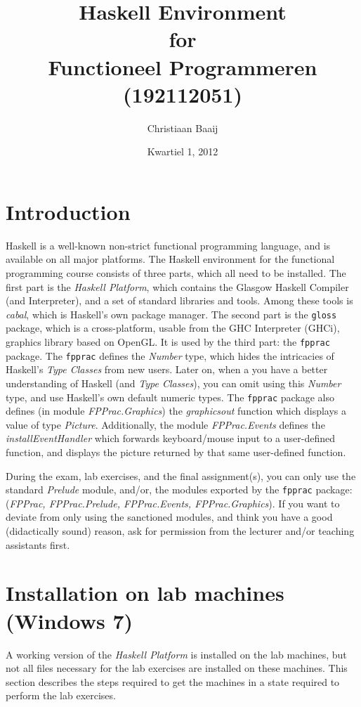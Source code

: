 \documentclass[]{article}
\title{Haskell Environment \\ for \\ Functioneel Programmeren (192112051)}
\author{Christiaan Baaij}
\date{Kwartiel 1, 2012}
\begin{document}

\maketitle

\section{Introduction}
Haskell is a well-known non-strict functional programming language, and is available on all major platforms.
The Haskell environment for the functional programming course consists of three parts, which all need to be installed.
The first part is the \emph{Haskell Platform}, which contains the Glasgow Haskell Compiler (and Interpreter), and a set of standard libraries and tools.
Among these tools is \emph{cabal}, which is Haskell's own package manager. The second part is the \texttt{gloss} package, which is a cross-platform, usable from the GHC Interpreter (GHCi), graphics library based on OpenGL.
It is used by the third part: the \texttt{fpprac} package. The \texttt{fpprac} defines the \emph{Number} type, which hides the intricacies of Haskell's \emph{Type Classes} from new users.
Later on, when a you have a better understanding of Haskell (and \emph{Type Classes}), you can omit using this \emph{Number} type, and use Haskell's own default numeric types.
The \texttt{fpprac} package also defines (in module \emph{FPPrac.Graphics}) the \emph{graphicsout} function which displays a value of type \emph{Picture}. Additionally, the module \emph{FPPrac.Events} defines the \emph{installEventHandler} which forwards keyboard/mouse input to a user-defined function, and displays the picture returned by that same user-defined function.

During the exam, lab exercises, and the final assignment(s), you can only use the standard \emph{Prelude} module, and/or, the modules exported by the \texttt{fpprac} package: (\emph{FPPrac, FPPrac.Prelude, FPPrac.Events, FPPrac.Graphics}).
If you want to deviate from only using the sanctioned modules, and think you have a good (didactically sound) reason, ask for permission from the lecturer and/or teaching assistants first.

\section{Installation on lab machines (Windows 7)}
A working version of the \emph{Haskell Platform} is installed on the lab machines, but not all files necessary for the lab exercises are installed on these machines.
This section describes the steps required to get the machines in a state required to perform the lab exercises.
\end{document}
